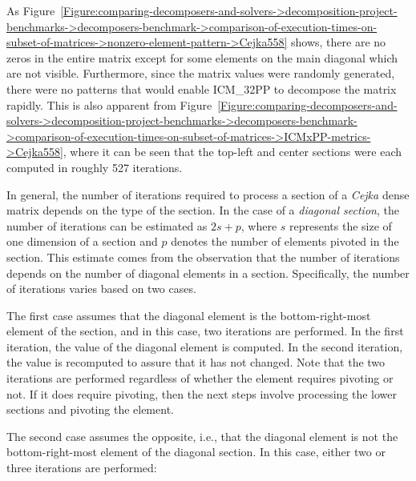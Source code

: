 As Figure~\ref{Figure:comparing-decomposers-and-solvers->decomposition-project-benchmarks->decomposers-benchmark->comparison-of-execution-times-on-subset-of-matrices->nonzero-element-pattern->Cejka558} shows, there are no zeros in the entire matrix except for some elements on the main diagonal which are not visible.
Furthermore, since the matrix values were randomly generated, there were no patterns that would enable ICM\_32PP to decompose the matrix rapidly.
This is also apparent from Figure~\ref{Figure:comparing-decomposers-and-solvers->decomposition-project-benchmarks->decomposers-benchmark->comparison-of-execution-times-on-subset-of-matrices->ICMxPP-metrics->Cejka558}, where it can be seen that the top-left and center sections were each computed in roughly 527 iterations.

In general, the number of iterations required to process a section of a \textit{Cejka} dense matrix depends on the type of the section.
In the case of a \textit{diagonal section}, the number of iterations can be estimated as $2s + p$, where $s$ represents the size of one dimension of a section and $p$ denotes the number of elements pivoted in the section.
This estimate comes from the observation that the number of iterations depends on the number of diagonal elements in a section.
Specifically, the number of iterations varies based on two cases.

The first case assumes that the diagonal element is the bottom-right-most element of the section, and in this case, two iterations are performed.
In the first iteration, the value of the diagonal element is computed.
In the second iteration, the value is recomputed to assure that it has not changed.
Note that the two iterations are performed regardless of whether the element requires pivoting or not.
If it does require pivoting, then the next steps involve processing the lower sections and pivoting the element.

The second case assumes the opposite, i.e., that the diagonal element is not the bottom-right-most element of the diagonal section.
In this case, either two or three iterations are performed:

